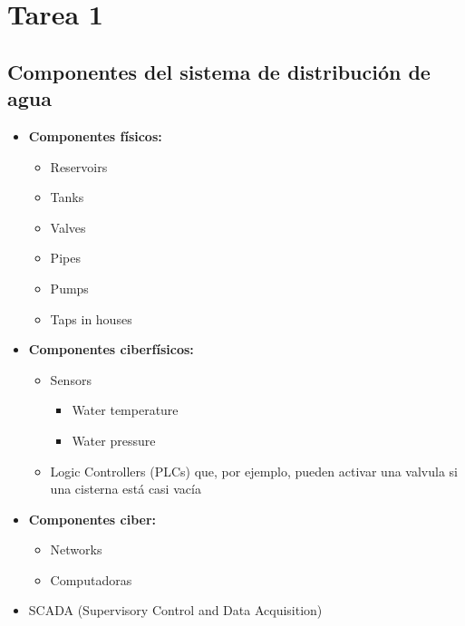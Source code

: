 \chapter{Tarea 1}








\section{Componentes del sistema de distribución de agua}

\begin{itemize}
   \item \textbf{Componentes físicos:}
   \begin{itemize}
      \item Reservoirs
      \item Tanks
      \item Valves
      \item Pipes
      \item Pumps
      \item Taps in houses
   \end{itemize}
   \item \textbf{Componentes ciberfísicos:}
   \begin{itemize}
      \item Sensors
      \begin{itemize}
         \item Water temperature
         \item Water pressure
      \end{itemize}
      \item Logic Controllers (PLCs) que, por ejemplo, pueden activar una valvula si una cisterna está casi vacía 
   \end{itemize}
   \item \textbf{Componentes ciber:}
   \begin{itemize}
      \item Networks
      \item Computadoras
   \end{itemize}
   \item SCADA (Supervisory Control and Data Acquisition)
\end{itemize}

